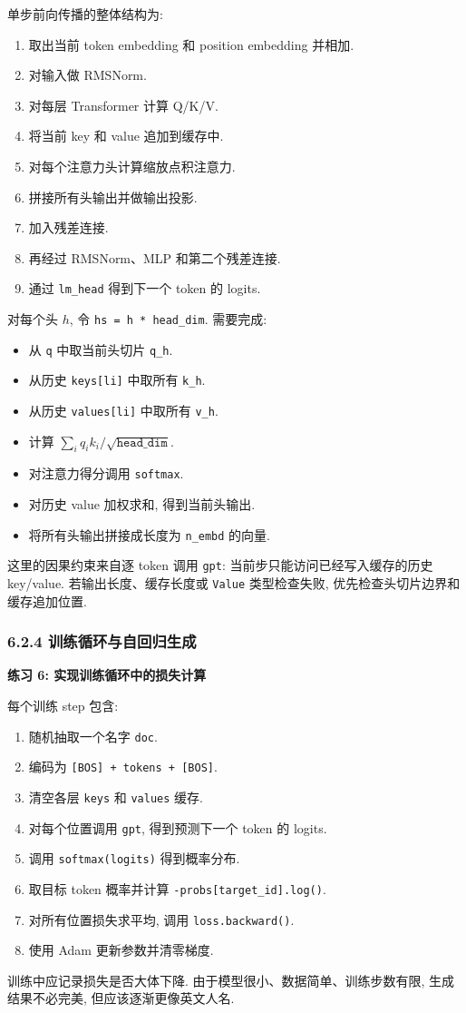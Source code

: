 \documentclass{../../nndlcourse}
\begin{document}
单步前向传播的整体结构为:
\begin{enumerate}
    \item 取出当前 token embedding 和 position embedding 并相加.
    \item 对输入做 RMSNorm.
    \item 对每层 Transformer 计算 Q/K/V.
    \item 将当前 key 和 value 追加到缓存中.
    \item 对每个注意力头计算缩放点积注意力.
    \item 拼接所有头输出并做输出投影.
    \item 加入残差连接.
    \item 再经过 RMSNorm、MLP 和第二个残差连接.
    \item 通过 \texttt{lm\_head} 得到下一个 token 的 logits.
\end{enumerate}

对每个头 $h$, 令 \texttt{hs = h * head\_dim}. 需要完成:
\begin{itemize}
    \item 从 \texttt{q} 中取当前头切片 \texttt{q\_h}.
    \item 从历史 \texttt{keys[li]} 中取所有 \texttt{k\_h}.
    \item 从历史 \texttt{values[li]} 中取所有 \texttt{v\_h}.
    \item 计算 $\sum_i q_i k_i / \sqrt{\texttt{head\_dim}}$.
    \item 对注意力得分调用 \texttt{softmax}.
    \item 对历史 value 加权求和, 得到当前头输出.
    \item 将所有头输出拼接成长度为 \texttt{n\_embd} 的向量.
\end{itemize}
这里的因果约束来自逐 token 调用 \texttt{gpt}: 当前步只能访问已经写入缓存的历史 key/value. 若输出长度、缓存长度或 \texttt{Value} 类型检查失败, 优先检查头切片边界和缓存追加位置.

\subsubsection*{6.2.4 训练循环与自回归生成}

\textbf{练习 6: 实现训练循环中的损失计算}

每个训练 step 包含:
\begin{enumerate}
    \item 随机抽取一个名字 \texttt{doc}.
    \item 编码为 \texttt{[BOS] + tokens + [BOS]}.
    \item 清空各层 \texttt{keys} 和 \texttt{values} 缓存.
    \item 对每个位置调用 \texttt{gpt}, 得到预测下一个 token 的 logits.
    \item 调用 \texttt{softmax(logits)} 得到概率分布.
    \item 取目标 token 概率并计算 \texttt{-probs[target\_id].log()}.
    \item 对所有位置损失求平均, 调用 \texttt{loss.backward()}.
    \item 使用 Adam 更新参数并清零梯度.
\end{enumerate}
训练中应记录损失是否大体下降. 由于模型很小、数据简单、训练步数有限, 生成结果不必完美, 但应该逐渐更像英文人名.
\end{document}
